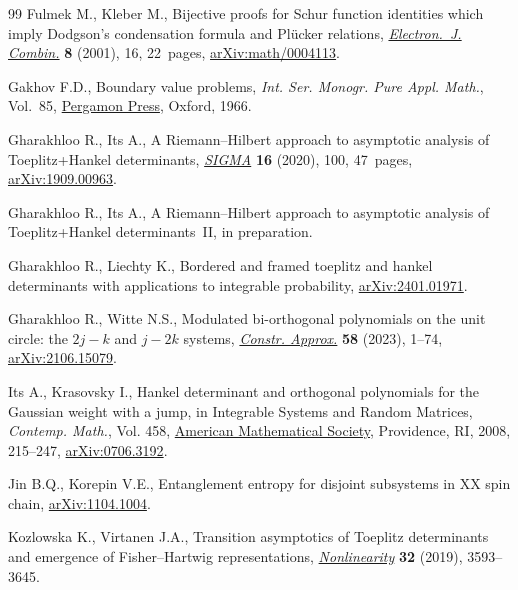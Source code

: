 \documentclass[10pt,a4paper]{amsart}
\numberwithin{equation}{section}
\begin{document}
\begin{thebibliography}{99}
Fulmek M., Kleber M., Bijective proofs for {S}chur function identities which
 imply {D}odgson's condensation formula and {P}l\"ucker relations,
 \href{https://doi.org/10.37236/1560}{\textit{Electron.~J. Combin.}} \textbf{8} (2001), 16, 22~pages,
 \href{https://arxiv.org/abs/math/0004113}{arXiv:math/0004113}.

Gakhov F.D., Boundary value problems, \textit{Int. Ser. Monogr. Pure Appl.
 Math.}, Vol.~85, \href{https://doi.org/10.1002/zamm.19670470318}{Pergamon Press}, Oxford, 1966.

Gharakhloo R., Its A., A {R}iemann--{H}ilbert approach to asymptotic analysis
 of {T}oeplitz+{H}ankel determinants, \href{https://doi.org/10.3842/SIGMA.2020.100}{\textit{SIGMA}} \textbf{16} (2020), 100,
 47~pages, \href{https://arxiv.org/abs/1909.00963}{arXiv:1909.00963}.

Gharakhloo R., Its A., A {R}iemann--{H}ilbert approach to asymptotic analysis
 of {T}oeplitz+{H}ankel determinants~{II}, in preparation.

Gharakhloo R., Liechty K., Bordered and framed toeplitz and hankel determinants
 with applications to integrable probability, \href{https://arxiv.org/abs/2401.01971}{arXiv:2401.01971}.

Gharakhloo R., Witte N.S., Modulated bi-orthogonal polynomials on the unit
 circle: the {$2j-k$} and {$j-2k$} systems, \href{https://doi.org/10.1007/s00365-022-09604-2}{\textit{Constr. Approx.}}
 \textbf{58} (2023), 1--74, \href{https://arxiv.org/abs/2106.15079}{arXiv:2106.15079}.

Its A., Krasovsky I., Hankel determinant and orthogonal polynomials for the
 {G}aussian weight with a jump, in Integrable {S}ystems and {R}andom
 {M}atrices, \textit{Contemp. Math.}, Vol. 458, \href{https://doi.org/10.1090/conm/458/08938}{American Mathematical Society}, Providence,
 RI, 2008, 215--247, \href{https://arxiv.org/abs/0706.3192}{arXiv:0706.3192}.

Jin B.Q., Korepin V.E., Entanglement entropy for disjoint subsystems in {XX}
 spin chain, \href{https://arxiv.org/abs/1104.1004}{arXiv:1104.1004}.

Kozlowska K., Virtanen J.A., Transition asymptotics of {T}oeplitz determinants
 and emergence of {F}isher--{H}artwig representations, \href{https://doi.org/10.1088/1361-6544/ab127a}{\textit{Nonlinearity}}
 \textbf{32} (2019), 3593--3645.


\end{thebibliography}
\end{document}
